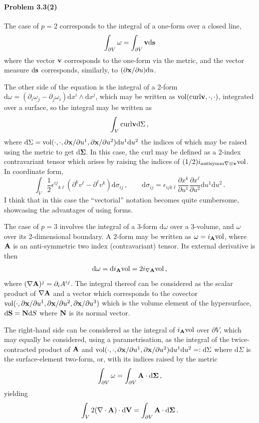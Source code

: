 \documentclass[a4paper,12pt]{article}
\def\d{\mathrm{d}}
\newcommand{\problem}[1]{\paragraph{Problem #1}}
\begin{document}

\problem{3.3(2)} The case of $p=2$ corresponds to the integral of a one-form over a closed line,
\[
 \int_{\partial V} \omega = \int_{\partial V}{\bf v}\d {\bf s}
\]
where the vector ${\bf v}$ corresponds to the one-form via the metric, and the vector measure $\d {\bf s}$ corresponds, similarly, to $(\partial {\bf x}/\partial u)\d u$.

The other side of the equation is the integral of a 2-form $\d\omega = (\partial_i \omega_j - \partial_j \omega_i)\d x^i \wedge \d x^j$, which may be written as ${\rm vol}({\rm curl}{\bf v}, \cdot, \cdot)$, integrated over a surface, so the integral may be written as
\[
 \int_{V}{\rm curl}{\bf v}\d \Sigma\,,
\]
where $\d\Sigma ={\rm vol}(\cdot, \cdot, \partial{\bf x}/\partial u^1, \partial{\bf x}/\partial u^2)\d u^1 \d u^2$
the indices of which may be raised using the metric to get $\d\boldsymbol{\Sigma}$. In this case, the curl may be defined as a 2-index contravariant tensor which arises by raising the indices of $(1/2)i_{{\rm antisymm}\nabla\otimes{\bf v}}{\rm vol}$. In coordinate form,
\[
 \int_V \frac{1}{2}\epsilon^{ij}{}_{k\ell}(\partial^k v^\ell-\partial^\ell v^k)\d \sigma_{ij}\,,\quad\quad \d \sigma_{ij} = \epsilon_{ijk\ell}\frac{\partial x^k}{\partial u^1}\frac{\partial x^\ell}{\partial u^2}\d u^1 \d u^2\,.
\]
I think that in this case the ``vectorial'' notation becomes quite cumbersome, showcasing the advantages of using forms.


The case of $p=3$ involves the integral of a 3-form $\d \omega$ over a 3-volume, and $\omega$ over its 2-dimensional boundary. A 2-form may be written as $\omega = i_{\bf A}{\rm vol}$, where ${\bf A}$ is an anti-symmetric two index (contravariant) tensor. Its external derivative is then
\[
 \d\omega = \d i_{\bf A} {\rm vol}= 2i_{\nabla {\bf A}}{\rm vol}\,,
\]
where $(\nabla {\bf A})^j = \partial_i A^{ij}$. The integral thereof can be considered as the scalar product of $\nabla {\bf A}$ and a vector which corresponds to the covector ${\rm vol}(\cdot, \partial{\bf x}/\partial u^1, \partial{\bf x}/\partial u^2, \partial{\bf x}/\partial u^3)$ which is the volume element of the hypersurface, $\d {\bf S} = {\bf N}\d S$ where ${\bf N}$ is its normal vector.


The right-hand side can be considered as the integral of $i_{\bf A}{\rm vol}$ over $\partial V$, which may equally be considered, using a parametrisation, as the integral of the twice-contracted product of ${\bf A}$ and ${\rm vol}(\cdot, \cdot, \partial{\bf x}/\partial u^1, \partial{\bf x}/\partial u^2)\d u^1 \d u^2 =: \d \Sigma$ where $\d \Sigma$ is the surface-element two-form, or, with its indices raised by the metric
\[
 \int_{\partial V}\omega = \int_{\partial V} {\bf A}\cdot \d \boldsymbol{\Sigma}\,,
\]
yielding
\[
 \int_V 2 (\nabla\cdot{\bf A})\cdot \d {\bf V} = \int_{\partial V} {\bf A}\cdot \d \boldsymbol{\Sigma}\,.
\]
\end{document}
